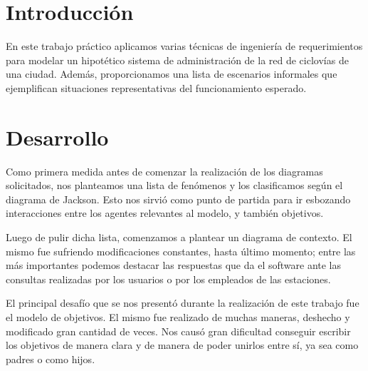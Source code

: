 \documentclass[a4paper, 10pt, twoside]{article}
\begin{document}
\newpage




\tableofcontents

\newpage




\section{Introducción}

En este trabajo práctico aplicamos varias técnicas de ingeniería de requerimientos para modelar un hipotético sistema de administración de la red de ciclovías de una ciudad. Además, proporcionamos una lista de escenarios informales que ejemplifican situaciones representativas del funcionamiento esperado.




\section{Desarrollo}

Como primera medida antes de comenzar la realización de los diagramas solicitados, nos planteamos una lista de fenómenos y los clasificamos según el diagrama de Jackson. Esto nos sirvió como punto de partida para ir esbozando interacciones entre los agentes relevantes al modelo, y también objetivos.

Luego de pulir dicha lista, comenzamos a plantear un diagrama de contexto. El mismo fue sufriendo modificaciones constantes, hasta último momento; entre las más importantes podemos destacar las respuestas que da el software ante las consultas realizadas por los usuarios o por los empleados de las estaciones.

El principal desafío que se nos presentó durante la realización de este trabajo fue el modelo de objetivos. El mismo fue realizado de muchas maneras, deshecho y modificado gran cantidad de veces. Nos causó gran dificultad conseguir escribir los objetivos de manera clara y de manera de poder unirlos entre sí, ya sea como padres o como hijos. 
\end{document}
